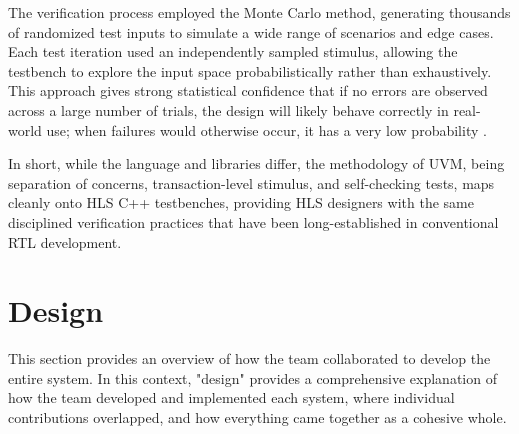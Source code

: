 \documentclass{article}
\begin{document}
    \par The verification process employed the Monte Carlo method, generating thousands of randomized test inputs to simulate a wide range of scenarios and edge cases. Each test iteration used an independently sampled stimulus, allowing the testbench to explore the input space probabilistically rather than exhaustively. This approach gives strong statistical confidence that if no errors are observed across a large number of trials, the design will likely behave correctly in real-world use; when failures would otherwise occur, it has a very low probability \cite{aldridge_understanding_2023}.
    \par In short, while the language and libraries differ, the methodology of UVM, being separation of concerns, transaction-level stimulus, and self-checking tests, maps cleanly onto HLS C++ testbenches, providing HLS designers with the same disciplined verification practices that have been long-established in conventional RTL development. 

\newpage\section{Design}
\label{sec:design}
    \noindent This section provides an overview of how the team collaborated to develop the entire system. In this context, "design" provides a comprehensive explanation of how the team developed and implemented each system, where individual contributions overlapped, and how everything came together as a cohesive whole.
\end{document}
